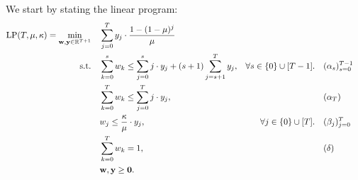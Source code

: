 We start by stating the linear program:
\begin{equation*}
\begin{aligned}
\mathrm{LP}(T,\mu, \kappa) = \min_{\mathbf{w}, \mathbf{y} \in \mathbb{R}^{T+1}} \quad &  \sum_{j=0}^T y_j  \cdot \frac{1-(1-\mu)^{j}}{\mu}\\
\text{s.t.} \quad & \sum_{k=0}^s w_k \leq \sum_{j=0}^s j \cdot y_j + (s+1)\sum_{j=s+1}^T y_j, & \forall s \in \{0\} \cup [T-1]. \quad & (\alpha_s)_{s=0}^{T-1}\\
\quad & \sum_{k=0}^T w_k \leq \sum_{j=0}^T j \cdot y_j, & & (\alpha_T)\\
\quad & w_j \leq \frac{\kappa}{\mu} \cdot y_j, & \forall j \in \{ 0 \} \cup [T]. \quad & (\beta_j)_{j=0}^{T}\\
\quad & \sum_{k=0}^T w_k = 1, & & (\delta)\\
\quad & \mathbf{w}, \mathbf{y} \geq \mathbf{0}.
\end{aligned}
\end{equation*} 

